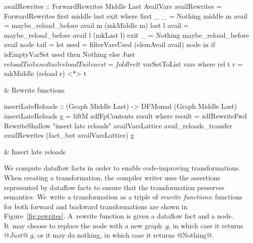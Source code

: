 \documentclass[blockstyle,preprint,nocopyrightspace]{sigplanconf}
\newcommand\figref[1]{Figure~\ref{fig:#1}}
\newcommand\figlabel[1]{\label{fig:#1}}
\begin{document}
\begin{figure*}
\begin{codetable}
\T\begin{code}
availRewrites :: ForwardRewrites Middle Last AvailVars
availRewrites = ForwardRewrites first middle last exit
  where first _ _ = Nothing
        middle m avail = maybe_reload_before avail m (mkMiddle m)
        last   l avail = maybe_reload_before avail l (mkLast l)
        exit _ = Nothing
        maybe_reload_before avail node tail =
            let used = filterVarsUsed (elemAvail avail) node
            in  if isEmptyVarSet used then Nothing
                else Just $ reloadTail used tail
        reloadTail vars t = foldl rel t $ varSetToList vars
          where rel t r = mkMiddle (reload r) <*> t
\end{code}\B
& Rewrite \mbox{functions}\\
\hline

\T\begin{code}
insertLateReloads :: (Graph Middle Last) -> DFMonad (Graph Middle Last)
insertLateReloads g = liftM zdfFpContents result
  where result = zdfRewriteFwd RewriteShallow "insert late reloads"
                               availVarsLattice avail_reloads_transfer
                               availRewrites (fact_bot availVarsLattice) g
\end{code}%
& Insert late reloads\\
\end{codetable}
\caption{Late-reload insertion, which relies on the analysis of \figref{avail}}
\figlabel{avail-rewrites}
\end{figure*}


We compute dataflow facts in order to enable code-improving
transformations.
When creating a transformation, the compiler writer uses
the assertions represented by dataflow facts to ensure that the
transformation preserves semantics.
We~write a transformation as a triple of
\emph{rewrite functions};
functions for both forward and backward transformations are shown in
\figref{rewrites}. 
%
A~rewrite function is given a dataflow fact and a node.
It~may choose to replace the node with a new graph~$g$, in which case it
returns $@Just@\;g$, or it may do nothing, in which case it returns @Nothing@.
\end{document}
